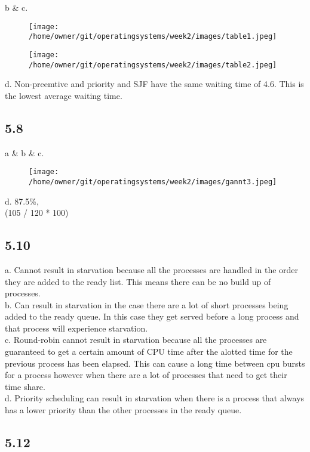 \documentclass[]{article}
\begin{document}
b \& c.
  
\begin{figure}[H]
  \texttt{[image: /home/owner/git/operatingsystems/week2/images/table1.jpeg]}
\end{figure}

\begin{figure}[H]
  \texttt{[image: /home/owner/git/operatingsystems/week2/images/table2.jpeg]}
\end{figure}

d. Non-preemtive and priority and SJF have the same waiting time of 4.6. This is the lowest average waiting time.

\subsection*{5.8}

a \& b \& c.
\begin{figure}[H]
  \texttt{[image: /home/owner/git/operatingsystems/week2/images/gannt3.jpeg]}
\end{figure}

d. 87.5\%,\\ (105 / 120 * 100)

\subsection*{5.10}

a. Cannot result in starvation because all the processes are handled in the order they are added to the ready list. This means there can be no build up of processes.\\
b. Can result in starvation in the case there are a lot of short processes being added to the ready queue. In this case they get served before a long process and that process will experience starvation.\\
c. Round-robin cannot result in starvation because all the processes are guaranteed to get a certain amount of CPU time after the alotted time for the previous process has been elapsed. This can cause a long time between cpu bursts for a process however when there are a lot of processes that need to get their time share.\\
d. Priority scheduling can result in starvation when there is a process that always has a lower priority than the other processes in the ready queue.\\

\subsection*{5.12}
\end{document}
